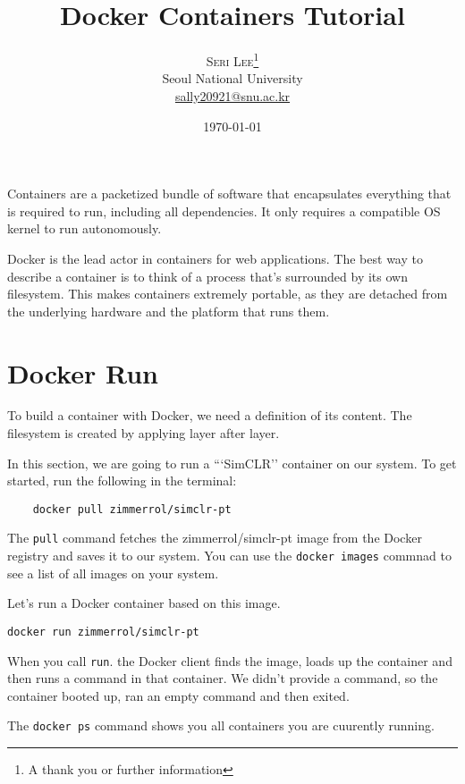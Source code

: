 \documentclass[twoside,twocolumn]{article}
\title{Docker Containers Tutorial} %
\author{%
\textsc{Seri Lee}\thanks{A thank you or further information} \\[1ex] %
\normalsize Seoul National University \\ %
\normalsize \href{mailto:sally20921@snu.ac.kr}{sally20921@snu.ac.kr} %
}
\date{\today} %
\begin{document}
\maketitle


Containers are a packetized bundle of software that encapsulates everything that is required to run, including all dependencies.
It only requires a compatible OS kernel to run autonomously.

Docker is the lead actor in containers for web applications.
The best way to describe a container is to think of a process that's surrounded by its own filesystem.
This makes containers extremely portable, as they are detached from the underlying hardware and the platform that runs them.

\section{Docker Run}
To build a container with Docker, we need a definition of its content.
The filesystem is created by applying layer after layer.

In this section, we are going to run a ```SimCLR'' container on our system.
To get started, run the following in the terminal:
\begin{verbatim}
    docker pull zimmerrol/simclr-pt
\end{verbatim}

The \texttt{pull} command fetches the zimmerrol/simclr-pt image from the Docker registry and saves it to our system.
You can use the \texttt{docker images} commnad to see a list of all images on your system.

Let's run a Docker container based on this image.
\begin{verbatim}
docker run zimmerrol/simclr-pt
\end{verbatim}

When you call \texttt{run}. the Docker client finds the image, loads up the container and then runs a command in that container.
We didn't provide a command, so the container booted up, ran an empty command and then exited.

The \texttt{docker ps} command shows you all containers you are cuurently running.
\end{document}
